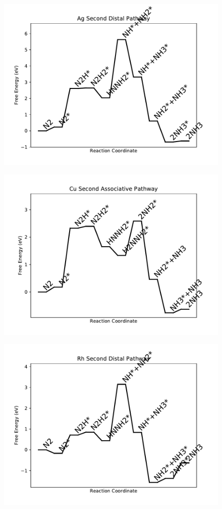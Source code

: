 \begin{figure}
\includegraphics[width=0.8\linewidth]{data/plots/Ag_distal_2.pdf}
\end{figure}

\begin{figure}
\includegraphics[width=0.8\linewidth]{data/plots/Cu_associative_2.pdf}
\end{figure}

\begin{figure}
\includegraphics[width=0.8\linewidth]{data/plots/Rh_distal_2.pdf}
\end{figure}

